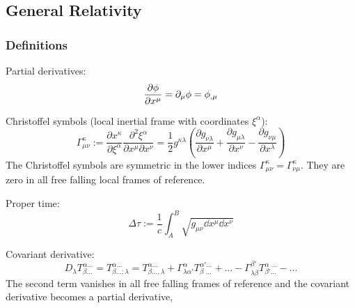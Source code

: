 	\subsection{General Relativity}
		\subsubsection{Definitions}
			\noindent
			Partial derivatives:
			\begin{equation}
				\pdv{\phi}{x^\mu} = \partial_\mu \phi = \phi_{,\mu}
			\end{equation}

			\noindent
			Christoffel symbols (local inertial frame with coordinates $\xi^\alpha$):
			\begin{equation}
				\Gamma_{\mu\nu}^{\kappa} := \frac{\partial x^\kappa}{\partial \xi^\alpha}\frac{\partial^2 \xi^\alpha}{\partial x^\mu\partial x^\nu}
				=\frac{1}{2}g^{\kappa\lambda}\left(\frac{\partial g_{\nu\lambda}}{\partial x^\mu}+\frac{\partial g_{\mu\lambda}}{\partial x^\nu}-\frac{\partial g_{\nu\mu}}{\partial x^\lambda}\right)
			\end{equation}
			The Christoffel symbols are symmetric in the lower indices $\Gamma_{\mu\nu}^{\kappa} = \Gamma_{\nu\mu}^{\kappa}$. They are zero in all free falling local frames of reference.

			\noindent
			Proper time:
			\begin{equation}
				\Delta\tau := \frac{1}{c}\int_A^B\sqrt{g_{\mu\nu}\dd x^\mu \dd x^\nu}
			\end{equation}

			\noindent
			Covariant derivative:
			\begin{equation}
				D_\lambda T^{\alpha ...}_{\beta...} =
				T^{\alpha ...}_{\beta...;\lambda} = T^{\alpha...}_{\beta ...,\lambda}
				+ \Gamma^\alpha_{\lambda\alpha'} T^{\alpha'...}_{\beta\phantom{\prime}...} + ...
				-\Gamma^{\beta'}_{\lambda\beta} T^{\alpha\phantom{\prime}...}_{\beta'...} - ...
			\end{equation}
			The second term vanishes in all free falling frames of reference and the covariant derivative becomes a partial derivative,

